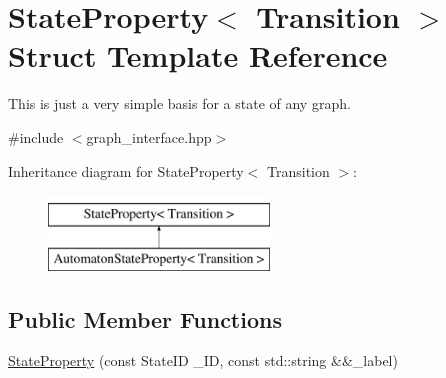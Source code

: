 \hypertarget{structStateProperty}{\section{\-State\-Property$<$ \-Transition $>$ \-Struct \-Template \-Reference}
\label{structStateProperty}
}


\-This is just a very simple basis for a state of any graph.  




{\ttfamily \#include $<$graph\-\_\-interface.\-hpp$>$}

\-Inheritance diagram for \-State\-Property$<$ \-Transition $>$\-:\begin{figure}[H]
\begin{center}
\leavevmode
\includegraphics[height=2.000000cm]{structStateProperty}
\end{center}
\end{figure}
\subsection*{\-Public \-Member \-Functions}
\begin{DoxyCompactItemize}
\item 
\hyperlink{structStateProperty_ae35beca78b7de03eb461dfea8f55fccb}{\-State\-Property} (const \-State\-I\-D \-\_\-\-I\-D, const std\-::string \&\&\-\_\-label)
\end{DoxyCompactItemize}
